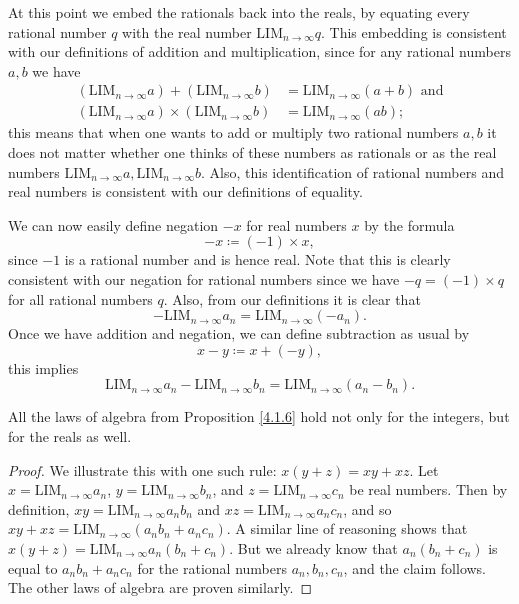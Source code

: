 \begin{note}
    At this point we embed the rationals back into the reals, by equating every rational number \(q\) with the real number \(\text{LIM}_{n \to \infty} q\).
    This embedding is consistent with our definitions of addition and multiplication, since for any rational numbers \(a, b\) we have
    \begin{align*}
        (\text{LIM}_{n \to \infty} a) + (\text{LIM}_{n \to \infty} b)      & = \text{LIM}_{n \to \infty} (a + b) \text{ and} \\
        (\text{LIM}_{n \to \infty} a) \times (\text{LIM}_{n \to \infty} b) & = \text{LIM}_{n \to \infty} (ab);
    \end{align*}
    this means that when one wants to add or multiply two rational numbers \(a, b\) it does not matter whether one thinks of these numbers as rationals or as the real numbers \(\text{LIM}_{n \to \infty} a, \text{LIM}_{n \to \infty} b\).
    Also, this identification of rational numbers and real numbers is consistent with our definitions of equality.
\end{note}

\begin{note}
    We can now easily define negation \(-x\) for real numbers \(x\) by the formula
    \[
        -x \coloneqq (-1) \times x,
    \]
    since \(-1\) is a rational number and is hence real.
    Note that this is clearly consistent with our negation for rational numbers since we have \(-q = (-1) \times q\) for all rational numbers \(q\).
    Also, from our definitions it is clear that
    \[
        -\text{LIM}_{n \to \infty} a_n = \text{LIM}_{n \to \infty} (-a_n).
    \]
    Once we have addition and negation, we can define subtraction as usual by
    \[
        x - y \coloneqq x + (-y),
    \]
    this implies
    \[
        \text{LIM}_{n \to \infty} a_n - \text{LIM}_{n \to \infty} b_n = \text{LIM}_{n \to \infty} (a_n - b_n).
    \]
\end{note}

\begin{proposition}\label{5.3.11}
    All the laws of algebra from Proposition \ref{4.1.6} hold not only for the integers, but for the reals as well.
\end{proposition}

\begin{proof}
    We illustrate this with one such rule: \(x(y + z) = xy + xz\).
    Let \(x = \text{LIM}_{n \to \infty} a_n\), \(y = \text{LIM}_{n \to \infty} b_n\), and \(z = \text{LIM}_{n \to \infty} c_n\) be real numbers.
    Then by definition, \(xy = \text{LIM}_{n \to \infty} a_n b_n\) and \(xz = \text{LIM}_{n \to \infty} a_n c_n\), and so \(xy + xz = \text{LIM}_{n \to \infty} (a_n b_n + a_n c_n)\).
    A similar line of reasoning shows that \(x(y + z) = \text{LIM}_{n \to \infty} a_n (b_n + c_n)\).
    But we already know that \(a_n (b_n + c_n)\) is equal to \(a_n b_n + a_n c_n\) for the rational numbers \(a_n, b_n, c_n\), and the claim follows.
    The other laws of algebra are proven similarly.
\end{proof}

